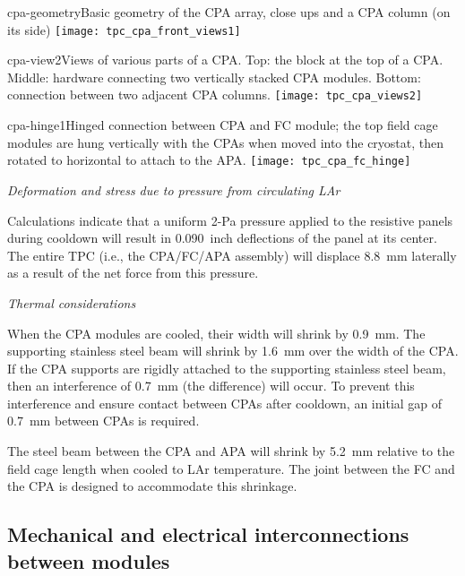 \begin{cdrfigure}{cpa-geometry}{Basic geometry of the CPA array, close ups and a CPA column (on its side)} 
\texttt{[image: tpc\_cpa\_front\_views1]}
\end{cdrfigure}

\begin{cdrfigure}{cpa-view2}{Views of various parts of a CPA. Top: the block at the top of a CPA. Middle: hardware connecting two vertically stacked CPA modules. Bottom: connection between two adjacent CPA columns.} 
\texttt{[image: tpc\_cpa\_views2]}
\end{cdrfigure}

\begin{cdrfigure}{cpa-hinge1}{Hinged connection between CPA and FC module; the top field cage modules are hung vertically with the CPAs when moved into the cryostat, then rotated to horizontal to attach to the APA.} 
\texttt{[image: tpc\_cpa\_fc\_hinge]}
\end{cdrfigure}


\textit{Deformation and stress due to pressure from circulating LAr}

Calculations indicate that a uniform 2-Pa pressure 
  applied to the resistive panels  during cooldown will result in 0.090~inch deflections of the panel at its center.  The entire TPC (i.e., the CPA/FC/APA assembly) will displace 8.8~mm laterally as a result of the net force from this pressure.  

\textit{Thermal considerations}

When the CPA modules are cooled, their width will shrink by 0.9~mm.  The supporting stainless steel beam will shrink by 1.6~mm over the width of the CPA.  If the CPA supports are rigidly attached to the supporting stainless steel beam, then an interference of 0.7~mm (the difference) will occur.  To prevent this interference and ensure contact between CPAs after cooldown, an initial gap of 0.7~mm between CPAs is required.  

The steel beam between the CPA and APA will shrink by 5.2~mm relative to the field cage length when cooled to LAr temperature.  The joint between the FC and the CPA is designed to accommodate this shrinkage.



\subsection{Mechanical and electrical interconnections between modules}

